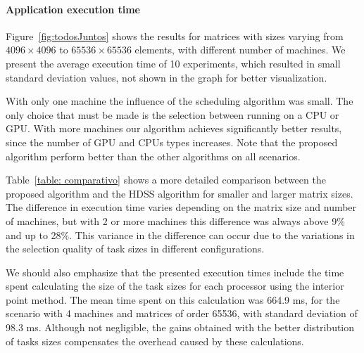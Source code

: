 \documentclass[journal]{IEEEtran}
\begin{document}

\paragraph{Application execution time} Figure~\ref{fig:todosJuntos} shows the 
results for matrices with sizes varying from $4096 \times 4096$ to $65536 \times
65536$ elements, with different number of machines. We present the average
execution time of 10 experiments, which resulted in small standard deviation
values, not shown in the graph for better visualization.


With
only one machine the influence of the scheduling algorithm was small. The only choice that must be made is the selection between running on a 
CPU or GPU.
With more machines our algorithm achieves significantly better
results, since the number of GPU and CPUs types increases. Note that  the proposed algorithm perform better than the other algorithms on
all scenarios.

Table~\ref{table: comparativo} shows a more detailed comparison between the
proposed algorithm and the HDSS algorithm for smaller and larger matrix sizes. The
difference in execution time varies depending on the matrix size and number of
machines, but with 2 or more machines this difference was always above 9\% and up to
28\%. This variance in the difference can occur due to the variations in the
selection quality of task sizes in different configurations.

%
We should also emphasize that the presented execution times include the time spent
calculating the size of the task sizes for each processor using the interior
point method. The mean time spent on this calculation was 664.9 ms, for the scenario with 4 machines and matrices of order 65536, with
standard deviation of 98.3 ms. Although not negligible, the gains obtained with
the better distribution of tasks sizes compensates the overhead caused by these calculations.

\end{document}
